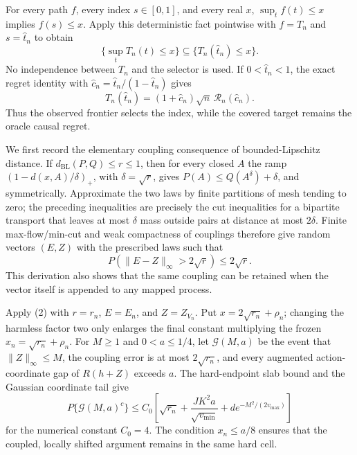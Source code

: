 For every path \(f\), every index \(s\in[0,1]\), and every real \(x\), \(\sup_tf(t)\le x\) implies \(f(s)\le x\).  Apply this deterministic fact pointwise with \(f=T_n\) and \(s=\widehat t_n\) to obtain
\[
 \{\sup_tT_n(t)\le x\}\subseteq\{T_n(\widehat t_n)\le x\}.
\]
No independence between \(T_n\) and the selector is used.  If \(0<\widehat t_n<1\), the exact regret identity with \(\widehat c_n=\widehat t_n/(1-\widehat t_n)\) gives
\[
 T_n(\widehat t_n)=(1+\widehat c_n)\sqrt n\,\mathscr R_n(\widehat c_n).
\]
Thus the observed frontier selects the index, while the covered target remains the oracle causal regret.

We first record the elementary coupling consequence of bounded-Lipschitz distance.  If \(d_{\mathrm{BL}}(P,Q)\le r\le1\), then for every closed \(A\) the ramp \((1-d(x,A)/\delta)_+\), with \(\delta=\sqrt r\), gives \(P(A)\le Q(A^\delta)+\delta\), and symmetrically.  Approximate the two laws by finite partitions of mesh tending to zero; the preceding inequalities are precisely the cut inequalities for a bipartite transport that leaves at most \(\delta\) mass outside pairs at distance at most \(2\delta\).  Finite max-flow/min-cut and weak compactness of couplings therefore give random vectors \((E,Z)\) with the prescribed laws such that
\[
 P(\|E-Z\|_\infty>2\sqrt r)\le2\sqrt r.                \tag{2}
\]
This derivation also shows that the same coupling can be retained when the vector itself is appended to any mapped process.

Apply (2) with \(r=r_n\), \(E=E_n\), and \(Z=Z_{V_n}\).  Put \(x=2\sqrt{r_n}+\rho_n\); changing the harmless factor two only enlarges the final constant multiplying the frozen \(x_n=\sqrt{r_n}+\rho_n\).  For \(M\ge1\) and \(0<a\le1/4\), let \(\mathcal G(M,a)\) be the event that \(\|Z\|_\infty\le M\), the coupling error is at most \(2\sqrt{r_n}\), and every augmented action-coordinate gap of \(R(h+Z)\) exceeds \(a\).  The hard-endpoint slab bound and the Gaussian coordinate tail give
\[
 P\{\mathcal G(M,a)^c\}
 \le C_0\left[\sqrt{r_n}+\frac{JK^2a}{\sqrt{v_{\min}}}
 +d e^{-M^2/(2v_{\max})}\right]                       \tag{3}
\]
for the numerical constant \(C_0=4\).  The condition \(x_n\le a/8\) ensures that the coupled, locally shifted argument remains in the same hard cell.


